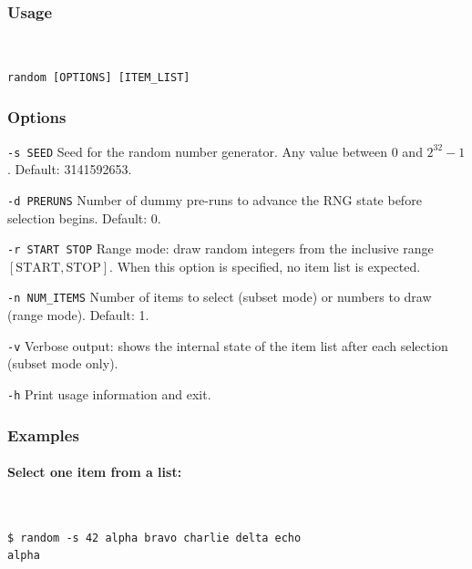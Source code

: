 \subsubsection{Usage}

{\tt
\begin{verbatim}
random [OPTIONS] [ITEM_LIST]
\end{verbatim}
}

\subsubsection{Options}

\begin{Descr}{40mm}
\item[\tt -s SEED]
        Seed for the random number generator. Any value between 0 and
        $2^{32}-1$. Default: 3141592653.

\item[\tt -d PRERUNS]
        Number of dummy pre-runs to advance the RNG state before
        selection begins. Default: 0.

\item[\tt -r START STOP]
        Range mode: draw random integers from the inclusive range
        $[\mathrm{START}, \mathrm{STOP}]$. When this option is specified,
        no item list is expected.

\item[\tt -n NUM\_ITEMS]
        Number of items to select (subset mode) or numbers to draw
        (range mode). Default: 1.

\item[\tt -v]
        Verbose output: shows the internal state of the item list
        after each selection (subset mode only).

\item[\tt -h]
        Print usage information and exit.
\end{Descr}

\subsubsection{Examples}

\paragraph{Select one item from a list:}
{\tt
\begin{verbatim}
$ random -s 42 alpha bravo charlie delta echo
alpha
\end{verbatim}
}

